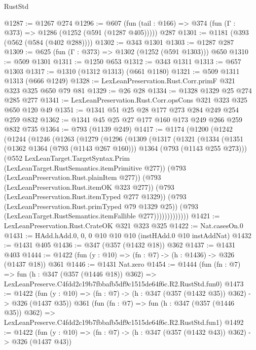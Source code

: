 \begin{lexlean}{RustStd}
\begin{coremodule}
@1287 := @1267 @274
@1296 := @607 (fun (tail : @166) => @374 (fun (Γ : @373) => @1286 (@1252 (@591 (@1287 @405))))) @287
@1301 := @1181 (@393 (@562 (@584 (@402 @288))))
@1302 := @343 @1301
@1303 := @1287 @287
@1309 := @625 (fun (Γ : @373) => @1302 (@1252 (@591 @1303))) @650
@1310 := @509 @1301
@1311 := @1250 @653
@1312 := @343 @1311
@1313 := @657 @1303
@1317 := @1310 (@1312 @1313) (@661 @1180)
@1321 := @509 @1311 @1313 (@666 @1249)
@1328 := LexLeanPreservation.Rust.Corr.primF @321 @323 @325 @650 @79 @81
@1329 := @26 @28
@1334 := @1328 @1329 @25 @274 @285 @277
@1341 := LexLeanPreservation.Rust.Corr.opsCons @321 @323 @325 @650 @120 @49
@1351 := @1341 @51 @25 @28 @177 @273 @284 @249 @254 @259 @832
@1362 := @1341 @45 @25 @27 @177 @160 @173 @249 @266 @259 @832 @735
@1364 := @793 (@1139 @249)
@1417 := @1174
    (@1200
      (@1242
        (@1244
          (@1246
            (@1263
              (@1279
                (@1296
                  (@1309
                    (@1317
                      (@1321
                        (@1334
                          (@1351
                            (@1362 @1364 (@793 (@1143 @267 @160)))
                            @1364
                            (@793 (@1143 @255 @273)))
                          (@552
                            LexLeanTarget.TargetSyntax.Prim
                            (LexLeanTarget.RustSemantics.itemPrimitive @277))
                          (@793 (LexLeanPreservation.Rust.plainItem @277))
                          (@793 (LexLeanPreservation.Rust.itemOK @323 @277))
                          (@793 (LexLeanPreservation.Rust.itemTyped @277 @1329))
                          (@793 (LexLeanPreservation.Rust.primTyped @79 @1329 @25))
                          (@793 (LexLeanTarget.RustSemantics.itemFallible @277)))))))))))))
@1421 := LexLeanPreservation.Rust.CrateOK @321 @323 @325
@1422 := Nat.casesOn.{0}
@1431 := HAdd.hAdd.{0, 0, 0} @10 @10 @10 (instHAdd.{0} @10 instAddNat)
@1432 := @1431 @405
@1436 := @347 (@357 (@1432 @18)) @362
@1437 := @1431 @403
@1444 := @1422 (fun (y : @10) => (fn : @7) -> (h : @1436) -> @326 (@1437 @18)) @361
@1446 := @1431 Nat.zero
@1454 := @1444
    (fun (fn : @7) =>
    fun (h : @347 (@357 (@1446 @18)) @362) =>
    LexLeanPreserve.C4fdd2c19b7fbbafb5df9c1515de64f6c.R2.RustStd.fun0)
@1473 := @1422
    (fun (y : @10) => (fn : @7) -> (h : @347 (@357 (@1432 @35)) @362) -> @326 (@1437 @35))
    @361
    (fun (fn : @7) =>
    fun (h : @347 (@357 (@1446 @35)) @362) =>
    LexLeanPreserve.C4fdd2c19b7fbbafb5df9c1515de64f6c.R2.RustStd.fun1)
@1492 := @1422
    (fun (y : @10) => (fn : @7) -> (h : @347 (@357 (@1432 @43)) @362) -> @326 (@1437 @43))

\end{coremodule}
\end{lexlean}
